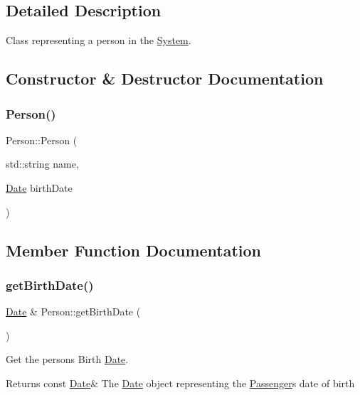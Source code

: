 \subsection{Detailed Description}
Class representing a person in the \mbox{\hyperlink{classSystem}{System}}. 

\subsection{Constructor \& Destructor Documentation}
\mbox{\label{classPerson_aa4fc660ce27df46986187ce76481f126}} 
\subsubsection{\texorpdfstring{Person()}{Person()}}
{\footnotesize\ttfamily Person\+::\+Person (\begin{DoxyParamCaption}\item[{std\+::string}]{name,  }\item[{\mbox{\hyperlink{classDate}{Date}}}]{birth\+Date }\end{DoxyParamCaption})}



\subsection{Member Function Documentation}
\mbox{\label{classPerson_a9f24821cb33c10e512eee2a5ad09c920}} 
\subsubsection{\texorpdfstring{get\+Birth\+Date()}{getBirthDate()}}
{\footnotesize\ttfamily \mbox{\hyperlink{classDate}{Date}} \& Person\+::get\+Birth\+Date (\begin{DoxyParamCaption}{ }\end{DoxyParamCaption})}



Get the person\textquotesingle{}s Birth \mbox{\hyperlink{classDate}{Date}}. 

\begin{DoxyReturn}{Returns}
const \mbox{\hyperlink{classDate}{Date}}\& The \mbox{\hyperlink{classDate}{Date}} object representing the \mbox{\hyperlink{classPassenger}{Passenger}}\textquotesingle{}s date of birth 
\end{DoxyReturn}
\mbox{\label{classPerson_ab20f096fdfd5201818c45754af4c3e3b}} 
